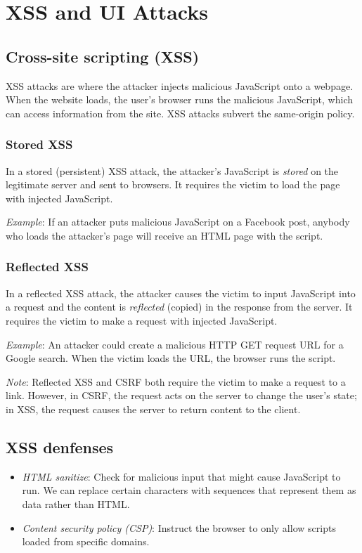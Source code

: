 \chapter{XSS and UI Attacks}

\section{Cross-site scripting (XSS)}
XSS attacks are where the attacker injects malicious JavaScript onto a webpage. When the website loads, the user's browser runs the malicious JavaScript, which can access information from the site. XSS attacks subvert the same-origin policy.

\subsection{Stored XSS}
In a stored (persistent) XSS attack, the attacker's JavaScript is \emph{stored} on the legitimate server and sent to browsers. It requires the victim to load the page with injected JavaScript.

\medskip
\emph{Example}: If an attacker puts malicious JavaScript on a Facebook post, anybody who loads the attacker's page will receive an HTML page with the script.

\subsection{Reflected XSS}
In a reflected XSS attack, the attacker causes the victim to input JavaScript into a request and the content is \emph{reflected} (copied) in the response from the server. It requires the victim to make a request with injected JavaScript.

\medskip
\emph{Example}: An attacker could create a malicious HTTP GET request URL for a Google search. When the victim loads the URL, the browser runs the script.

\medskip
\emph{Note}: Reflected XSS and CSRF both require the victim to make a request to a link. However, in CSRF, the request acts on the server to change the user's state; in XSS, the request causes the server to return content to the client.

\section{XSS denfenses}
\begin{itemize}
    \item \emph{HTML sanitize}: Check for malicious input that might cause JavaScript to run. We can replace certain characters with sequences that represent them as data rather than HTML.
    \item \emph{Content security policy (CSP)}: Instruct the browser to only allow scripts loaded from specific domains.
\end{itemize}

